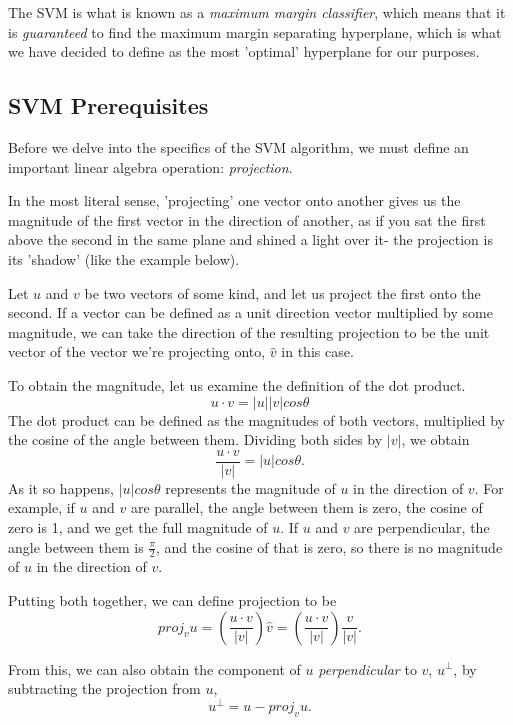 The SVM is what is known as a \textit{maximum margin classifier}, which means that it is \textit{guaranteed} to find the maximum margin separating hyperplane, which is what we have decided to define as the most 'optimal' hyperplane for our purposes.

\subsection{SVM Prerequisites}
Before we delve into the specifics of the SVM algorithm, we must define an important linear algebra operation: \textit{projection}.

In the most literal sense, 'projecting' one vector onto another gives us the magnitude of the first vector in the direction of another, as if you sat the first above the second in the same plane and shined a light over it- the projection is its 'shadow' (like the example below).


Let $u$ and $v$ be two vectors of some kind, and let us project the first onto the second. If a vector can be defined as a unit direction vector multiplied by some magnitude, we can take the direction of the resulting projection to be the unit vector of the vector we're projecting onto, $\hat{v}$ in this case.

To obtain the magnitude, let us examine the definition of the dot product.
\[
    u \cdot v = |u||v|cos\theta
\]
The dot product can be defined as the magnitudes of both vectors, multiplied by the cosine of the angle between them. Dividing both sides by $|v|$, we obtain
\[
    \frac{u \cdot v}{|v|} = |u|cos\theta.
\]
As it so happens, $|u|cos\theta$ represents the magnitude of $u$ in the direction of $v$. For example, if $u$ and $v$ are parallel, the angle between them is zero, the cosine of zero is 1, and we get the full magnitude of $u$. If $u$ and $v$ are perpendicular, the angle between them is $\frac{\pi}{2}$, and the cosine of that is zero, so there is no magnitude of $u$ in the direction of $v$.

Putting both together, we can define projection to be
\[
    proj_vu = (\frac{u \cdot v}{|v|})\hat{v} = (\frac{u \cdot v}{|v|})\frac{v}{|v|}.
\]

From this, we can also obtain the component of $u$ \textit{perpendicular} to $v$, $u^\perp$, by subtracting the projection from $u$,
\[
    u^\perp = u - proj_vu.
\]

